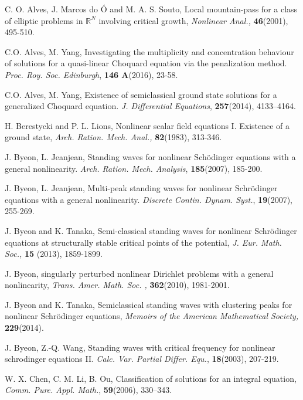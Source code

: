 \documentclass[12pt,reqno]{amsart}
\numberwithin{equation}{section}
\begin{document}
\begin{thebibliography}{100}

 C. O. Alves, J. Marcos do \'{O} and M. A. S. Souto, Local mountain-pass for a class of elliptic problems in $\mathbb{R}^N$ involving critical growth, {\it Nonlinear Anal., }{\bf  46}(2001),  495-510.

 C.O. Alves, M. Yang, Investigating the multiplicity and concentration behaviour of solutions for a
quasi-linear Choquard equation via the penalization method. {\it Proc. Roy. Soc. Edinburgh}, {\bf 146 A}(2016), 23-58.

 C.O. Alves, M. Yang, Existence of semiclassical ground state solutions for a generalized Choquard equation. {\it J. Differential Equations}, {\bf 257}(2014), 4133--4164.

 H. Berestycki and P. L. Lions, Nonlinear scalar field equations I. Existence of a ground state, {\it Arch. Ration. Mech. Anal.,} {\bf 82}(1983), 313-346.

 J. Byeon, L. Jeanjean, Standing waves for nonlinear Sch\"{o}dinger equations with a general nonlinearity. {\it Arch. Ration. Mech. Analysis}, {\bf 185}(2007), 185-200.

J. Byeon, L. Jeanjean, Multi-peak standing waves for nonlinear Schr\"{o}dinger equations with a general nonlinearity. {\it Discrete
Contin. Dynam. Syst.}, {\bf 19}(2007), 255-269.

 J. Byeon and K. Tanaka, Semi-classical standing waves for nonlinear Schr\"{o}dinger equations at structurally stable critical points of the potential, {\it J. Eur. Math. Soc., } {\bf 15} (2013), 1859-1899.

 J. Byeon, singularly perturbed nonlinear Dirichlet problems with a general nonlinearity, {\it Trans. Amer. Math. Soc. , } {\bf 362}(2010),  1981-2001.

 J. Byeon and K. Tanaka, Semiclassical standing waves with clustering peaks for nonlinear
Schr\"{o}dinger equations, {\it Memoirs of the American Mathematical
Society,} {\bf 229}(2014).

 J. Byeon, Z.-Q. Wang, Standing waves with critical frequency for nonlinear schrodinger equations II. {\it Calc. Var. Partial Differ. Equ.}, {\bf 18}(2003), 207-219.

 W. X. Chen, C. M. Li, B. Ou, Classification of solutions for an integral equation, {\it Comm. Pure. Appl. Math.}, {\bf 59}(2006), 330--343.


\end{thebibliography}
\end{document}
